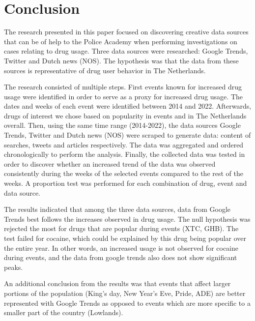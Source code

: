 \section{Conclusion}
The research presented in this paper focused on discovering creative data sources that can be of help to the Police Academy when performing investigations on cases relating to drug usage. Three data sources were researched: Google Trends, Twitter and Dutch news (NOS). The hypothesis was that the data from these sources is representative of drug user behavior in The Netherlands.

The research consisted of multiple steps. First events known for increased drug usage were identified in order to serve as a proxy for increased drug usage. The dates and weeks of each event were identified between 2014 and 2022. Afterwards, drugs of interest we chose based on popularity in events and in The Netherlands overall. Then, using the same time range (2014-2022), the data sources Google Trends, Twitter and Dutch news (NOS) were scraped to generate data: content of searches, tweets  and articles respectively. The data was aggregated and ordered chronologically to perform the analysis. Finally, the collected data was tested in order to discover whether an increased trend of the data was observed consistently during the weeks of the selected events compared to the rest of the weeks. A proportion test was performed for each combination of drug, event and data source. 

The results indicated that among the three data sources, data from Google Trends best follows the increases observed in drug usage. The null hypothesis was rejected the most for drugs that are popular during events (XTC, GHB). The test failed for cocaine, which could be explained by this drug being popular over the entire year. In other words, an increased usage is not observed for cocaine during events, and the data from google trends also does not show significant peaks. 

An additional conclusion from the results was that events that affect larger portions of the population (King’s day, New Year’s Eve, Pride, ADE) are better represented with Google Trends as opposed to events which are more specific to a smaller part of the country (Lowlands). 
